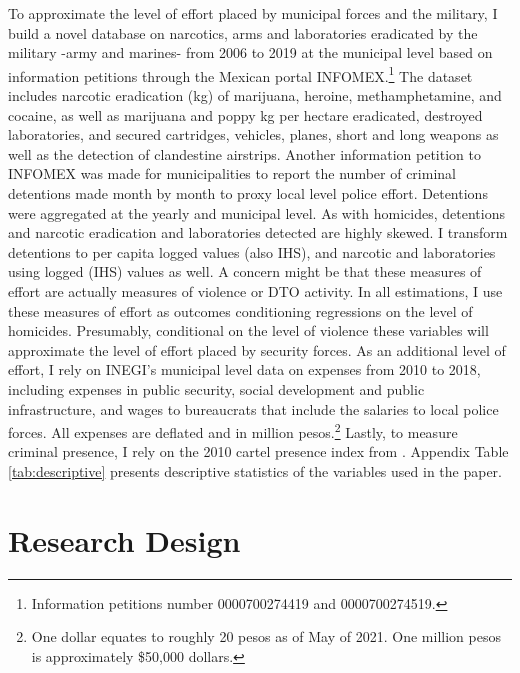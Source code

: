 To approximate the level of effort placed by municipal forces and the military, I build a novel database on narcotics, arms and laboratories eradicated by the military -army and marines- from 2006 to 2019 at the municipal level  based on information petitions through the Mexican portal INFOMEX.\footnote{Information petitions number 0000700274419 and 0000700274519.} The dataset includes narcotic eradication (kg) of marijuana, heroine, methamphetamine, and cocaine, as well as marijuana and poppy kg per hectare eradicated, destroyed laboratories, and secured cartridges, vehicles, planes, short and long weapons as well as the detection of clandestine airstrips.  Another information petition to INFOMEX was made for municipalities to report the number of criminal detentions made month by month to proxy local level police effort. Detentions were aggregated at the yearly and municipal level. As with homicides, detentions and narcotic eradication and laboratories detected are highly skewed. I transform detentions to per capita logged values (also IHS), and narcotic and laboratories using logged (IHS) values as well. A concern might be that these measures of effort are actually measures of violence or DTO activity. In all estimations, I use these measures of effort as outcomes conditioning regressions on the level of homicides. Presumably, conditional on the level of violence these variables will approximate the level of effort placed by security forces. As an additional level of effort,  I rely on INEGI's municipal level data on expenses from 2010 to 2018, including expenses in public security, social development and public infrastructure,  and wages to bureaucrats that include the salaries to local police forces. All expenses are deflated and in million pesos.\footnote{One dollar equates to roughly 20 pesos as of May of 2021. One million pesos is approximately \$50,000 dollars.} Lastly, to measure criminal presence, I rely on the 2010 cartel presence index from \citet{camilo_etal_2018}. 
 Appendix Table \ref{tab:descriptive} presents descriptive statistics of the variables used in the paper.
  
\section{Research Design \label{sec:design}}  
     
